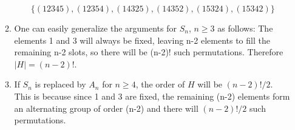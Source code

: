 \documentclass{article}
\begin{document}
\begin{enumerate}
\begin{enumerate}
        $$\{(12345), (12354), (14325), (14352), (15324), (15342)\}$$
        \item One can easily generalize the arguments for $S_n$, $n \geq 3$ as follows: The elements 1 and 3 will always be fixed, leaving n-2 elements to fill the remaining n-2 slots, so there will be (n-2)! such permutations. Therefore $|H| = (n-2)!$.
        \item If $S_n$ is replaced by $A_n$ for $n \geq 4$, the order of $H$ will be $(n-2)!/2$. This is because since 1 and 3 are fixed, the remaining (n-2) elements form an alternating group of order (n-2) and there will $(n-2)!/2$ such permutations.
    \end{enumerate}
\end{enumerate}
\end{document}
